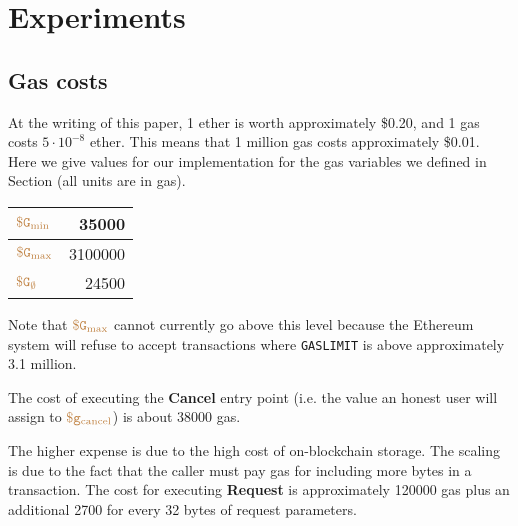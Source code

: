 \section{Experiments}




\subsection{Gas costs}

At the writing of this paper, 1 ether is worth approximately \$0.20, and 1 gas costs $5 \cdot 10^{-8}$ ether.
This means that 1 million gas costs approximately \$0.01.
Here we give values for our implementation for the gas variables we defined in Section  (all units are in gas).
\begin{center}
  \begin{tabular}{lr}
    \hline
    $\tt {\color{brown} \$G_\text{min} }$ & \num[group-separator={,}]{35000} \\
    \hline
    $\tt {\color{brown} \$G_\text{max} }$ & \num[group-separator={,}]{3100000} \\
    \hline
    $\tt {\color{brown} \$G_\emptyset }$ & \num[group-separator={,}]{24500} \\
    \hline
  \end{tabular}
\end{center}
Note that $\tt {\color{brown} \$G_\text{max} }$ cannot currently go above this level because the Ethereum system will refuse to accept transactions where {\tt GASLIMIT} is above approximately 3.1 million.

The cost of executing the {\bf Cancel} entry point (i.e. the value an honest user will assign to $\tt {\color{brown} \$g_\text{cancel} }$) is about \num[group-separator={,}]{38000} gas.

The higher expense is due to the high cost of on-blockchain storage.
The scaling is due to the fact that the caller must pay gas for including more bytes in a transaction.
The cost for executing {\bf Request} is approximately \num[group-separator={,}]{120000} gas plus an additional \num[group-separator={,}]{2700} for every 32 bytes of request parameters.


